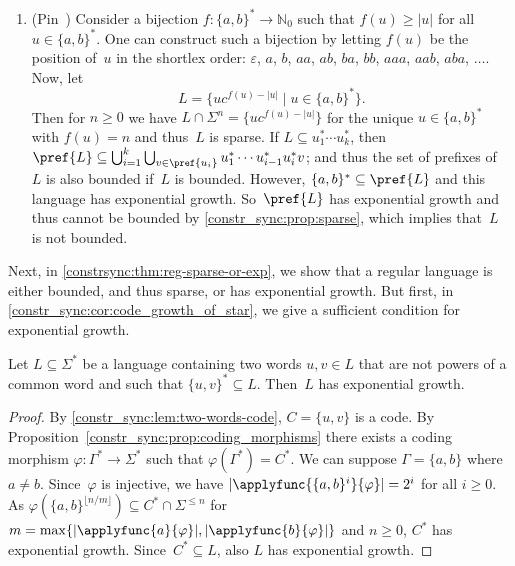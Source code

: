 \begin{example}
\begin{enumerate}
		\item \label{syncmax:growth:ex:sparse-not-bounded:3} (Pin~\cite[Sect.~XII.4.2]{Pin2022}) Consider
		a bijection $f \colon \{a,b\}^* \to \mathbb N_0$
		such that $f(u) \ge |u|$ for all $u \in \{a,b\}^*$.
		One can construct such a bijection by letting $f(u)$
		be the position of~$u$ in the shortlex order: $\varepsilon$, $a$, $b$, $aa$, $ab$, $ba$, $bb$, $aaa$, $aab$, $aba$, $\ldots$. Now, let
		\[
		 L = \{ u c^{f(u) - |u|} \mid u \in \{a,b\}^*\}.
		\]
		Then for $n \ge 0$ 
		we have $L \cap \Sigma^n = \{ uc^{f(u) - |u|} \}$
		for the unique $u \in \{a,b\}^*$
		with $f(u) = n$ and thus~$L$ is sparse.		
		If $L \subseteq u_1^* \cdots u_k^*$,
		then $\pref{L} \subseteq \bigcup_{i=1}^{k} \bigcup_{v \in \pref{u_i}} u_1^* \cdots u_{i-1}^* u_i^* v$;
		and thus the set of prefixes of~$L$ is also bounded if~$L$ is bounded.
		However, $\{a,b\}^* \subseteq \pref{L}$
		and this language has exponential growth.
		So~$\pref{L}$ has exponential growth
		and thus cannot be bounded by \cref{constr_sync:prop:sparse},
		which implies that~$L$ is not bounded.
	\end{enumerate}	
\end{example}

Next, in \cref{constrsync:thm:reg-sparse-or-exp},
we show that a regular language is either bounded, and thus sparse,
or has exponential growth. But first, in \cref{constr_sync:cor:code_growth_of_star},
we give a sufficient condition for exponential growth. 

\begin{proposition} \label{constr_sync:cor:code_growth_of_star}
	Let $L \subseteq \Sigma^*$ be a language
	containing two words $u,v \in L$
	that are not powers of a common word
	and such that $\{u,v\}^* \subseteq L$.
	Then~$L$ has exponential growth.	
\end{proposition}
\begin{proof}
	By \cref{constr_sync:lem:two-words-code}, $C = \{u,v\}$
	is a code.
	By Proposition~\ref{constr_sync:prop:coding_morphisms} 
	there exists a coding morphism $\varphi \colon \Gamma^* \to \Sigma^*$
	such that $\varphi(\Gamma^*) = C^*$.
	We can suppose $\Gamma = \{a,b\}$ where $a \ne b$.	
	Since~$\varphi$ is injective, we have 
	$|\applyfunc{\{a,b\}^i}{\varphi}| = 2^i$
	for all $i \ge 0$.
	As $\varphi(\{a,b\}^{\lfloor n / m \rfloor}) \subseteq C^* \cap \Sigma^{\le n}$ 
	for
	$m = \max\{ |\applyfunc{a}{\varphi}|, |\applyfunc{b}{\varphi}| \}$
	and $n \ge 0$, $C^*$ has exponential growth.
	Since~$C^* \subseteq L$, also $L$ has exponential growth.
\end{proof}

